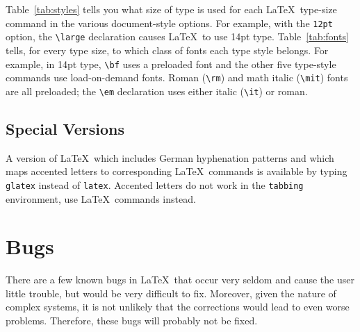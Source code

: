 Table~\ref{tab:styles} tells you what size of type is used for each
\LaTeX\ type-size command in the various document-style options.  For
example, with the {\tt 12pt} option, the \hbox{\verb|\large|}
declaration causes \LaTeX\ to use 14pt type.  Table~\ref{tab:fonts}
tells, for every type size, to which class of fonts each type style
belongs.  For example, in 14pt type, \verb|\bf| uses a preloaded
font and the other five type-style commands use load-on-demand fonts.
Roman (\verb|\rm|) and math italic (\verb|\mit|) fonts are all
preloaded; the \hbox{\verb|\em|} declaration uses either italic
(\verb|\it|) or roman.
 
 
 
 
\subsection{Special Versions}

A version of \LaTeX\ which includes German hyphenation patterns
and which maps accented letters to corresponding \LaTeX\ commands
is available by typing \verb|glatex| instead of \verb|latex|.
Accented letters do not work in the \verb|tabbing| environment,
use \LaTeX\ commands instead.
 
 
\section{Bugs}
 
There are a few known bugs in \LaTeX\ that occur very seldom and
cause the user little trouble, but would be very difficult to fix.
Moreover, given the nature of complex systems, it is not unlikely that
the corrections would lead to even worse problems.  Therefore, these
bugs will probably not be fixed.  
 
